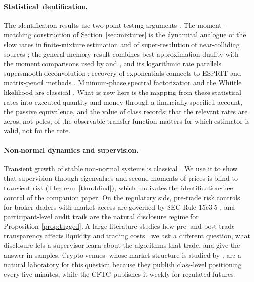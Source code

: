 \documentclass[12pt]{article}
\theoremstyle{definition}
\theoremstyle{remark}
\begin{document}
\paragraph{Statistical identification.} The identification results use two-point testing arguments \citep{lecam1986,tsybakov2009}. The moment-matching construction of Section~\ref{sec:mixtures} is the dynamical analogue of the slow rates in finite-mixture estimation \citep{manole2022} and of super-resolution of near-colliding sources \citep{liu2023,batenkov2021}; the general-memory result combines best-approximation duality \citep{bernstein1914,rivlin1981} with the moment comparisons used by \citet{kong2017} and \citet{wu2020}, and its logarithmic rate parallels supersmooth deconvolution \citep{fan1991}; recovery of exponentials connects to ESPRIT and matrix-pencil methods \citep{roy1989,hua1990}. Minimum-phase spectral factorization and the Whittle likelihood are classical \citep{whittle1953}. What is new here is the mapping from these statistical rates into executed quantity and money through a financially specified account, the passive equivalence, and the value of class records; that the relevant rates are zeros, not poles, of the observable transfer function matters for which estimator is valid, not for the rate.

\paragraph{Non-normal dynamics and supervision.} Transient growth of stable non-normal systems is classical \citep{trefethen2005,kreiss1962}. We use it to show that supervision through eigenvalues and second moments of prices is blind to transient risk (Theorem~\ref{thm:blind}), which motivates the identification-free control of the companion paper. On the regulatory side, pre-trade risk controls for broker-dealers with market access are governed by SEC Rule 15c3-5 \citep{sec2010}, and participant-level audit trails are the natural disclosure regime for Proposition~\ref{prop:tagged}. A large literature studies how pre- and post-trade transparency affects liquidity and trading costs \citep{pagano1996,boehmer2005,bessembinder2006}; we ask a different question, what disclosure lets a supervisor learn about the algorithms that trade, and give the answer in samples. Crypto venues, whose market structure is studied by \citet{makarov2020}, are a natural laboratory for this question because they publish class-level positioning every five minutes, while the CFTC publishes it weekly for regulated futures.
\end{document}
